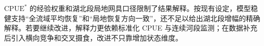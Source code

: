 $\mathrm{CPUE}^*$ 的经验权重和湖北段局地网具口径限制了结果解释。按现有设定，模型稳健支持“全流域平均恢复”和“局地恢复方向一致”，还不足以给出湖北段增幅的精确解释。若要继续改进，解释力更依赖标准化 CPUE 与连续河段监测；在数据补充后引入横向竞争和交叉摄食，改进不只靠增加状态维度。
